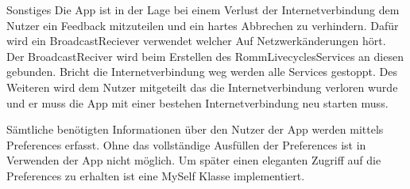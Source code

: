 Sonstiges
Die App ist in der Lage bei einem Verlust der Internetverbindung dem Nutzer ein Feedback mitzuteilen und ein hartes Abbrechen zu verhindern. Dafür wird ein BroadcastReciever verwendet welcher Auf Netzwerkänderungen hört. Der BroadcastReciver wird beim Erstellen des RommLivecyclesServices an diesen gebunden. Bricht die Internetverbindung weg werden alle Services gestoppt. Des Weiteren wird dem Nutzer mitgeteilt das die Internetverbindung verloren wurde und er muss die App mit einer bestehen Internetverbindung neu starten muss.

Sämtliche benötigten Informationen über den Nutzer der App werden mittels Preferences erfasst. Ohne das vollständige Ausfüllen der Preferences ist in Verwenden der App nicht möglich. Um später einen eleganten Zugriff auf die Preferences zu erhalten ist eine MySelf Klasse implementiert.

